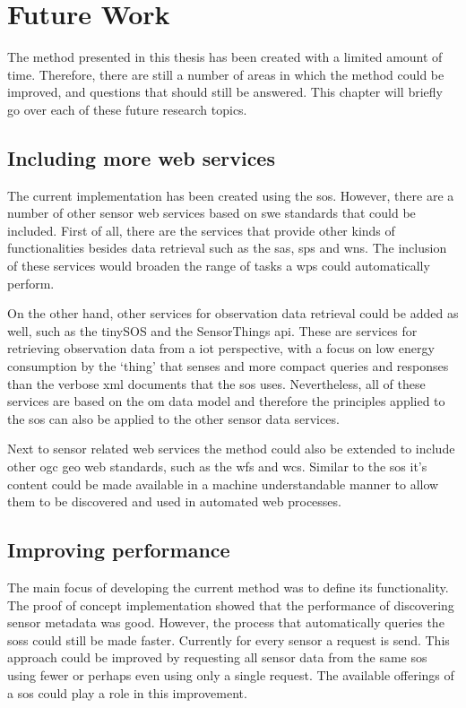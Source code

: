 
\chapter{Future Work}
\label{chap:futureResearch}

The method presented in this thesis has been created with a limited amount of time. Therefore, there are still a number of areas in which the method could be improved, and questions that should still be answered. This chapter will briefly go over each of these future research topics. 

\section*{Including more web services}
The current implementation has been created using the \ac{sos}. However, there are a number of other sensor web services based on \ac{swe} standards that could be included. First of all, there are the services that provide other kinds of functionalities besides data retrieval such as the \acf{sas}, \acf{sps} and \acf{wns}. The inclusion of these services would broaden the range of tasks a \ac{wps} could automatically perform. 

On the other hand, other services for observation data retrieval could be added as well, such as the tinySOS and the SensorThings \ac{api}. These are services for retrieving observation data from a \ac{iot} perspective, with a focus on low energy consumption by the `thing' that senses and more compact queries and responses than the verbose \ac{xml} documents that the \ac{sos} uses. Nevertheless, all of these services are based on the \ac{om} data model and therefore the principles applied to the \ac{sos} can also be applied to the other sensor data services.  

Next to sensor related web services the method could also be extended to include other \ac{ogc} geo web standards, such as the \acf{wfs} and \acf{wcs}. Similar to the \ac{sos} it's content could be made available in a machine understandable manner to allow them to be discovered and used in automated web processes.    

\section*{Improving performance}
The main focus of developing the current method was to define its functionality. The proof of concept implementation showed that the performance of discovering sensor metadata was good. However, the process that automatically queries the \aclp{sos} could still be made faster. Currently for every sensor a request is send. This approach could be improved by requesting all sensor data from the same \ac{sos} using fewer or perhaps even using only a single request. The available offerings of a \ac{sos} could play a role in this improvement.    

